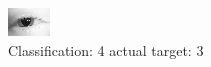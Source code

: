 \begin{figure}[h!]
\begin{center}
\includegraphics[width=0.60\columnwidth]{figures/ID126_class_4_target_3.png}
\end{center}
\caption{ Classification: 4 actual target: 3}
\label{fig:ID126_class_4_target_3}
\end{figure}

